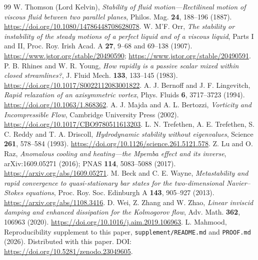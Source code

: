 \documentclass[11pt]{article}
\begin{document}
\aistatement
\begin{thebibliography}{99}
 W. Thomson (Lord Kelvin),
\emph{Stability of fluid motion---Rectilineal motion of viscous fluid between
two parallel planes}, Philos. Mag. \textbf{24}, 188--196 (1887).
\url{https://doi.org/10.1080/14786448708628078}.
 W. M'F. Orr,
\emph{The stability or instability of the steady motions of a perfect liquid
and of a viscous liquid}, Parts I and II, Proc. Roy. Irish Acad. A
\textbf{27}, 9--68 and 69--138 (1907).
\url{https://www.jstor.org/stable/20490590};
\url{https://www.jstor.org/stable/20490591}.
 P. B. Rhines and W. R. Young,
\emph{How rapidly is a passive scalar mixed within closed streamlines?},
J. Fluid Mech. \textbf{133}, 133--145 (1983).
\url{https://doi.org/10.1017/S0022112083001822}.
 A. J. Bernoff and J. F. Lingevitch,
\emph{Rapid relaxation of an axisymmetric vortex},
Phys. Fluids \textbf{6}, 3717--3723 (1994).
\url{https://doi.org/10.1063/1.868362}.
 A. J. Majda and A. L. Bertozzi,
\emph{Vorticity and Incompressible Flow}, Cambridge University Press (2002).
\url{https://doi.org/10.1017/CBO9780511613203}.
 L. N. Trefethen, A. E. Trefethen, S. C. Reddy
and T. A. Driscoll, \emph{Hydrodynamic stability without eigenvalues},
Science \textbf{261}, 578--584 (1993).
\url{https://doi.org/10.1126/science.261.5121.578}.
 Z. Lu and O. Raz,
\emph{Anomalous cooling and heating---the Mpemba effect and its inverse},
arXiv:1609.05271 (2016); PNAS \textbf{114}, 5083--5088 (2017).
\url{https://arxiv.org/abs/1609.05271}.
 M. Beck and C. E. Wayne,
\emph{Metastability and rapid convergence to quasi-stationary bar states
for the two-dimensional Navier--Stokes equations},
Proc. Roy. Soc. Edinburgh A \textbf{143}, 905--927 (2013).
\url{https://arxiv.org/abs/1108.3416}.
 D. Wei, Z. Zhang and W. Zhao,
\emph{Linear inviscid damping and enhanced dissipation for the Kolmogorov flow},
Adv. Math. \textbf{362}, 106963 (2020).
\url{https://doi.org/10.1016/j.aim.2019.106963}.
 L. Mahmood, Reproducibility supplement to this paper,
\texttt{supplement/README.md} and \texttt{PROOF.md} (2026).
Distributed with this paper. DOI:
\url{https://doi.org/10.5281/zenodo.23049605}.
\end{thebibliography}
\end{document}
